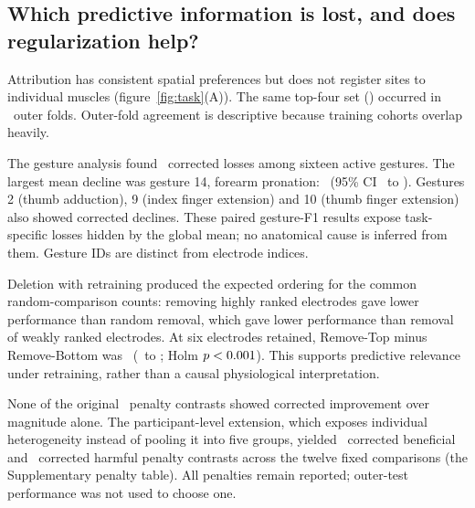 \subsection{Which predictive information is lost, and does regularization help?}
Attribution has consistent spatial preferences but does not register sites to individual muscles (figure~\ref{fig:task}(A)). The same top-four set (\TopFourSet) occurred in \TopFourFolds\ outer folds. Outer-fold agreement is descriptive because training cohorts overlap heavily.

The gesture analysis found \RevGestureLossCount\ corrected losses among sixteen active gestures. The largest mean decline was gesture 14, forearm pronation: \RevWorstGestureDelta\ (95\% CI \RevWorstGestureLow\ to \RevWorstGestureHigh). Gestures 2 (thumb adduction), 9 (index finger extension) and 10 (thumb finger extension) also showed corrected declines. These paired gesture-F1 results expose task-specific losses hidden by the global mean; no anatomical cause is inferred from them. Gesture IDs are distinct from electrode indices.

Deletion with retraining produced the expected ordering for the common random-comparison counts: removing highly ranked electrodes gave lower performance than random removal, which gave lower performance than removal of weakly ranked electrodes. At six electrodes retained, Remove-Top minus Remove-Bottom was \FaithTBKSixDiff\ (\FaithTBKSixLCB\ to \FaithTBKSixUCB; Holm $p< 0.001$). This supports predictive relevance under retraining, rather than a causal physiological interpretation.

None of the original \HThreeNTests\ penalty contrasts showed corrected improvement over magnitude alone. The participant-level extension, which exposes individual heterogeneity instead of pooling it into five groups, yielded \RevPenaltyBenefitCount\ corrected beneficial and \RevPenaltyHarmCount\ corrected harmful penalty contrasts across the twelve fixed comparisons (the Supplementary penalty table). All penalties remain reported; outer-test performance was not used to choose one.



